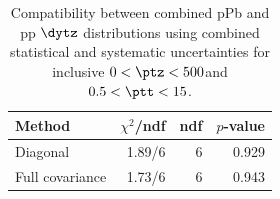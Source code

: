 \begin{table}[htp!]
\centering
\begin{tabular}{|l|r|r|r|}
\hline
Method & $\chi^2$/ndf & ndf & $p$-value \\
\hline
Diagonal & 1.89/6 & 6 & 0.929 \\
Full covariance & 1.73/6 & 6 & 0.943 \\
\hline
\end{tabular}
\caption{Compatibility between combined pPb and pp $\dytz$ distributions using combined statistical and systematic uncertainties for inclusive $0 < \ptz < 500$\GeV and $0.5 < \ptt < 15$\GeV.}
\label{table:chisq_deta}
\end{table}
